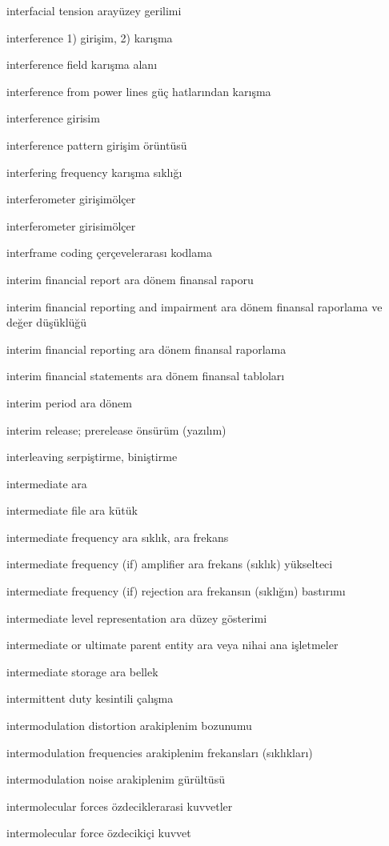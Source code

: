 \documentclass[12pt,fleqn]{article}\usepackage{../../common}
\begin{document}
interfacial tension arayüzey gerilimi

interference 1) girişim, 2) karışma

interference field karışma alanı

interference from power lines güç hatlarından karışma

interference girisim

interference pattern girişim örüntüsü

interfering frequency karışma sıklığı

interferometer girişimölçer

interferometer girisimölçer

interframe coding çerçevelerarası kodlama

interim financial report ara dönem finansal raporu

interim financial reporting and impairment ara dönem finansal raporlama ve değer düşüklüğü

interim financial reporting ara dönem finansal raporlama

interim financial statements ara dönem finansal tabloları

interim period ara dönem

interim release; prerelease önsürüm (yazılım)

interleaving serpiştirme, biniştirme

intermediate ara

intermediate file ara kütük

intermediate frequency ara sıklık, ara frekans

intermediate frequency (if) amplifier ara frekans (sıklık) yükselteci

intermediate frequency (if) rejection ara frekansın (sıklığın) bastırımı

intermediate level representation ara düzey gösterimi

intermediate or ultimate parent entity ara veya nihai ana işletmeler

intermediate storage ara bellek

intermittent duty kesintili çalışma

intermodulation distortion arakiplenim bozunumu

intermodulation frequencies arakiplenim frekansları (sıklıkları)

intermodulation noise arakiplenim gürültüsü

intermolecular forces özdeciklerarasi kuvvetler

intermolecular force özdecikiçi kuvvet
\end{document}

